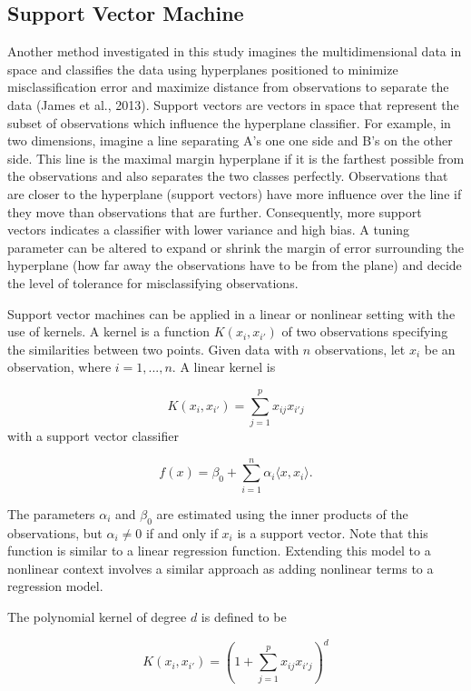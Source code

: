 \documentclass[12pt,twoside]{reedthesis}
\begin{document}
\hypertarget{support-vector-machine}{%
\subsection{Support Vector Machine}\label{support-vector-machine}}

Another method investigated in this study imagines the multidimensional data in space and classifies the data using hyperplanes positioned to minimize misclassification error and maximize distance from observations to separate the data (James et al., 2013). Support vectors are vectors in space that represent the subset of observations which influence the hyperplane classifier. For example, in two dimensions, imagine a line separating A's one one side and B's on the other side. This line is the maximal margin hyperplane if it is the farthest possible from the observations and also separates the two classes perfectly. Observations that are closer to the hyperplane (support vectors) have more influence over the line if they move than observations that are further. Consequently, more support vectors indicates a classifier with lower variance and high bias. A tuning parameter can be altered to expand or shrink the margin of error surrounding the hyperplane (how far away the observations have to be from the plane) and decide the level of tolerance for misclassifying observations.

Support vector machines can be applied in a linear or nonlinear setting with the use of kernels. A kernel is a function \(K(x_i, x_{i'})\) of two observations specifying the similarities between two points. Given data with \(n\) observations, let \(x_i\) be an observation, where \(i = 1, ... ,n\). A linear kernel is

\[K(x_i, x_{i'}) = \sum_{j = 1}^p x_{ij}x_{i'j}\]
with a support vector classifier

\[f(x) = \beta_0 + \sum_{i = 1}^n \alpha_i \langle x, x_i \rangle.\]

The parameters \(\alpha_i\) and \(\beta_0\) are estimated using the inner products of the observations, but \(\alpha_i \neq 0\) if and only if \(x_i\) is a support vector. Note that this function is similar to a linear regression function. Extending this model to a nonlinear context involves a similar approach as adding nonlinear terms to a regression model.

The polynomial kernel of degree \(d\) is defined to be

\[K(x_i, x_{i'}) = \left( 1 + \sum_{j = 1}^p x_{ij}x_{i'j}\right)^d\]
\end{document}
